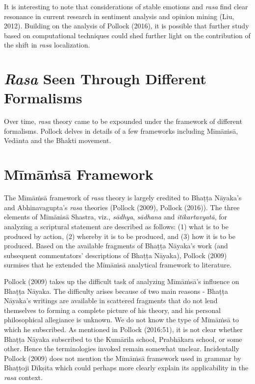\newpage

It is interesting to note that considerations of stable emotions and \textsl{rasa} find clear resonance in current research in sentiment analysis and opinion mining (Liu, 2012). Building on the analysis of Pollock (2016), it is possible that further study based on computational techniques could shed further light on the contribution of the shift in \textsl{rasa} localization.\\[-20pt] 

\section*{\textsl{Rasa} Seen Through Different Formalisms}

Over time, \textsl{rasa} theory came to be expounded under the framework of different formalisms. Pollock delves in details of a few frameworks including Mīmāṁsā, Vedānta and the Bhakti movement.\\[-20pt]

\section*{Mīmāṁsā Framework}

The Mīmāṁsā framework of \textsl{rasa} theory is largely credited to Bhaṭṭa Nāyaka’s and Abhinavagupta’s \textsl{rasa} theories (Pollock (2009), Pollock (2016)). The three elements of Mīmāṁsā Shastra, viz., \textsl{sādhya}, \textsl{sādhana} and \textsl{itikartavyatā}, for analyzing a scriptural statement are described as follows: (1) what is to be produced by action, (2) whereby it is to be produced, and (3) how it is to be produced. Based on the available fragments of Bhaṭṭa Nāyaka’s work (and subsequent commentators’ descriptions of Bhaṭṭa Nāyaka), Pollock (2009) surmises that he extended the Mīmāṁsā analytical framework to literature. 

Pollock (2009) takes up the difficult task of analyzing Mīmāṁsā’s influence on Bhaṭṭa Nāyaka. The difficulty arises because of two main reasons - Bhaṭṭa Nāyaka’s writings are available in scattered fragments that do not lend themselves to forming a complete picture of his theory, and his personal philosophical allegiance is unknown. We do not know the type of Mīmāṁsā to which he subscribed. As mentioned in Pollock (2016:51), it is not clear whether Bhaṭṭa Nāyaka subscribed to the Kumārila school, Prabhākara school, or some other. Hence the terminologies invoked remain somewhat unclear. Incidentally Pollock (2009) does not mention the Mīmāṁsā framework used in grammar by Bhaṭṭoji Dīkṣita which could perhaps more clearly explain its applicability in the \textsl{rasa} context.\\[-20pt] 

